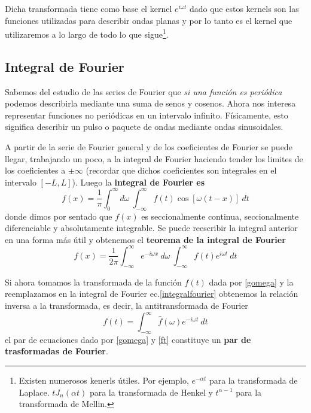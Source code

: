 Dicha transformada tiene como base el kernel $e^{i\omega t}$ dado que estos kernels son las funciones utilizadas para describir ondas planas y por lo tanto es el kernel que utilizaremos a lo largo de todo lo que sigue\footnote{Existen numerosos kenerls útiles. Por ejemplo, $e^{-\alpha t}$ para la transformada de Laplace. $tJ_n(\alpha t)$ para la transformada de Henkel y $t^{\alpha-1}$ para la transformada de Mellin.}. 

\subsection{\textbf{Integral de Fourier}}
Sabemos del estudio de las series de Fourier que \textit{si una función es periódica} podemos describirla mediante una suma de senos y cosenos. Ahora nos interesa representar funciones no periódicas en un intervalo infinito. Físicamente, esto significa describir un pulso o paquete de ondas mediante ondas sinusoidales. 

A partir de la serie de Fourier general y de los coeficientes de Fourier se puede llegar, trabajando un poco, a la integral de Fourier haciendo tender los limites de los coeficientes a $\pm \infty$ (recordar que dichos coeficientes son integrales en el intervalo $[-L,L]$). Luego la \textbf{integral de Fourier es}
\begin{equation}
    f(x) = \frac{1}{\pi} \int_0^\infty d\omega ~ \int_{-\infty}^\infty f(t) \cos{[\omega(t-x)]}~dt
\end{equation}
donde dimos por sentado que $f(x)$ es seccionalmente continua, seccionalmente diferenciable y absolutamente integrable. Se puede reescribir la integral anterior en una forma más útil y obtenemos el \textbf{teorema de la integral de Fourier}
\begin{equation}
     f(x) = \frac{1}{2\pi} \int_{-\infty}^\infty e^{-i\omega x}~ d\omega ~ \int_{-\infty}^\infty f(t) e^{i\omega t}~dt
     \label{integralfourier}
\end{equation}

Si ahora tomamos la transformada de la función $f(t)$ dada por \ref{gomega} y la reemplazamos en la integral de Fourier ec.\ref{integralfourier} obtenemos la relación inversa a la transformada, es decir, la antitransformada de Fourier
\begin{equation}
f(t)  = \int_{-\infty}^\infty \hat{f}(\omega)e^{-i\omega t}~dt 
\label{ft}
\end{equation}
el par de ecuaciones dado por \ref{gomega} y \ref{ft} constituye un \textbf{par de trasformadas de Fourier}.

